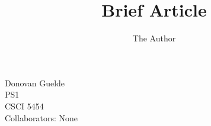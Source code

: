 \documentclass[11pt, oneside]{article}   	%
\title{Brief Article}
\author{The Author}
\begin{document}
\begin{flushright}
 Donovan Guelde\\
PS1\\
CSCI 5454\\
Collaborators: None\\
\end{flushright}
\end{document}

